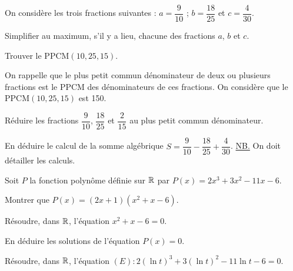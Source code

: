 \documentclass[11pt]{article}
\begin{document}

On considère les trois fractions suivantes : $a = \dfrac{9}{10}$ ; $b = \dfrac{18}{25}$ et $c = \dfrac{4}{30}$.
\begin{questions}
  \item Simplifier au maximum, s'il y a lieu, chacune des fractions $a$, $b$ et $c$.
  \item Trouver le $\mathrm{PPCM}(10, 25, 15)$.
  \item On rappelle que le plus petit commun dénominateur de deux ou plusieurs fractions est le PPCM des dénominateurs de ces fractions. On considère que le $\mathrm{PPCM}(10, 25, 15)$ est 150.
  \begin{sousq}
    \item Réduire les fractions $\dfrac{9}{10}$, $\dfrac{18}{25}$ et $\dfrac{2}{15}$ au plus petit commun dénominateur.
    \item En déduire le calcul de la somme algébrique $S = \dfrac{9}{10} - \dfrac{18}{25} + \dfrac{4}{30}$. \underline{NB.} On doit détailler les calculs.
  \end{sousq}
\end{questions}

Soit $P$ la fonction polynôme définie sur $\mathbb{R}$ par $P(x) = 2x^3 + 3x^2 - 11x - 6$.
\begin{questions}
  \item \begin{sousq}
    \item Montrer que $P(x) = (2x + 1)(x^2 + x - 6)$.
    \item Résoudre, dans $\mathbb{R}$, l'équation $x^2 + x - 6 = 0$.
    \item En déduire les solutions de l'équation $P(x) = 0$.
  \end{sousq}
  \item Résoudre, dans $\mathbb{R}$, l'équation $(E) : 2(\ln t)^3 + 3(\ln t)^2 - 11\ln t - 6 = 0$.
\end{questions}
\end{document}
